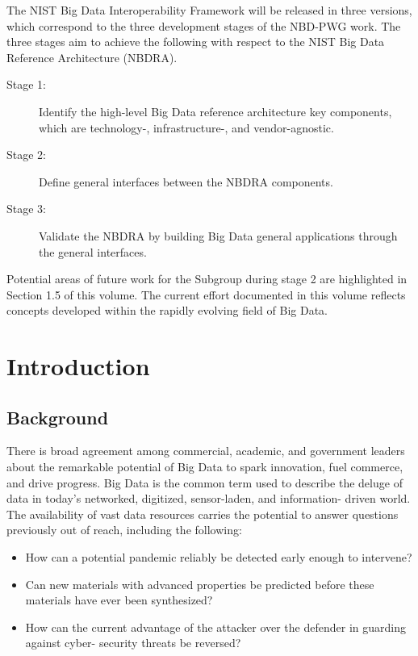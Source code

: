 \documentclass[11pt]{article}
\begin{document}
The NIST Big Data Interoperability Framework will be released in three versions, which correspond to 
the three development stages of the NBD-PWG work. The three stages aim to achieve the following with 
respect to the NIST Big Data Reference Architecture (NBDRA).

\begin{description}
\item[Stage 1:]	 Identify the high-level Big Data reference architecture key components, which are 
technology-, infrastructure-, and vendor-agnostic.
\item[Stage 2:]	 Define general interfaces between the NBDRA components.
\item[Stage 3:]	 Validate the NBDRA by building Big Data general applications through the general 
interfaces.
\end{description}

Potential areas of future work for the Subgroup during stage 2 are highlighted in Section 1.5 of this 
volume. The current effort documented in this volume reflects concepts developed within the rapidly 
evolving field of Big Data.



\section{Introduction}

\subsection{Background}

There is broad agreement among commercial, academic, and government leaders about the remarkable 
potential of Big Data to spark innovation, fuel commerce, and drive progress. Big Data is the common 
term used to describe the deluge of data in today’s networked, digitized, sensor-laden, and information-
driven world. The availability of vast data resources carries the potential to answer questions previously 
out of reach, including the following:

\begin{itemize}
\item	How can a potential pandemic reliably be detected early enough to intervene? 
\item	Can new materials with advanced properties be predicted before these materials have ever been 
synthesized? 
\item	How can the current advantage of the attacker over the defender in guarding against cyber-
security threats be reversed? 
\end{itemize}
\end{document}
